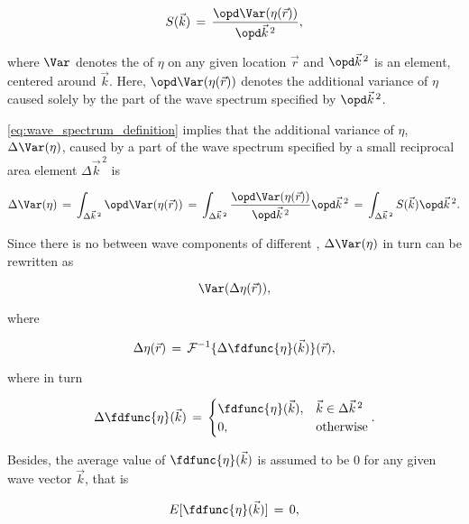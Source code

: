 {\begin{equation} \label{eq:wave_spectrum_definition}
S(\vec{k}) \,=\, \frac{\opd \Var(\eta(\vec{r}))}{\opd\vec{k}^{\,2}},
\end{equation}

where $\Var$ denotes the \variance of $\eta$ on any given location $\vec{r}$ and $\opd\vec{k}^{\,2}$ is an \infinitesimal {} element, centered around $\vec{k}$. Here, $\opd \Var(\eta(\vec{r}))$ denotes the additional variance of $\eta$ caused solely by the part of the wave spectrum specified by $\opd\vec{k}^{\,2}$.

\eqref{eq:wave_spectrum_definition} implies that the additional variance of $\eta$, $\Delta\Var(\eta)$, caused by a part of the wave spectrum specified by a small reciprocal area element $\Delta\vec{k}^{\,2}$ is

\begin{equation}
\Delta\Var(\eta) \,=\, \int_{\Delta\vec{k}^{\,2}}\opd \Var(\eta(\vec{r})) \,=\, \int_{\Delta\vec{k}^{\,2}}\frac{\opd \Var(\eta(\vec{r}))}{\opd\vec{k}^{\,2}}\opd\vec{k}^{\,2} \,=\, \int_{\Delta\vec{k}^{\,2}}S(\vec{k})\opd\vec{k}^{\,2}.
\end{equation}

Since there is no \correlation between wave components of different \wavelengths, $\Delta\Var(\eta)$ in turn can be rewritten as

\begin{equation}
\Var(\Delta\eta(\vec{r})),
\end{equation}

where

\begin{equation}
\Delta\eta(\vec{r}) \,=\, \mathcal{F}^{-1}\{\Delta\fdfunc{\eta}(\vec{k})\}(\vec{r}),
\end{equation}

where in turn

\begin{equation}
\Delta\fdfunc{\eta}(\vec{k}) \,=\, \begin{cases}
\fdfunc{\eta}(\vec{k}), & \vec{k} \in \Delta\vec{k}^{\,2} \\
0, & \text{otherwise}
\end{cases}.
\end{equation}

Besides, the average value of $\fdfunc{\eta}(\vec{k})$ is assumed to be 0 for any given wave vector $\vec{k}$, that is

\begin{equation} \label{eq:zero_expectation_value_reciprocal_space}
E[\fdfunc{\eta}(\vec{k})] \,=\, 0,
\end{equation}

}

